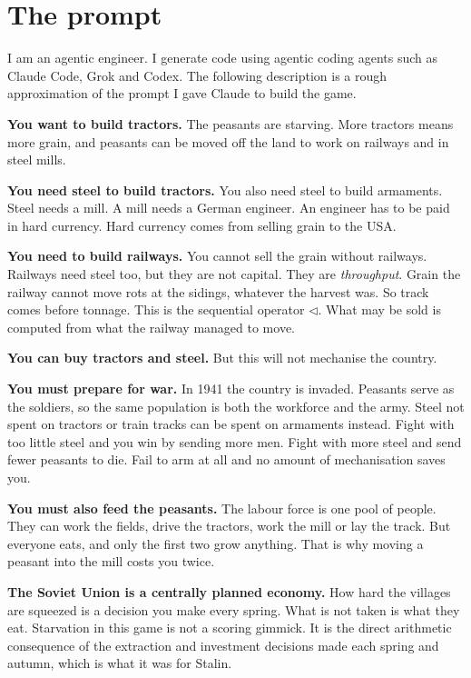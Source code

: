 \documentclass[11pt,a4paper]{article}
\begin{document}
\vspace{6mm}

\section{The prompt}

I am an agentic engineer. I generate code using agentic coding agents such as Claude Code, Grok and
Codex. The following description is a rough approximation of the prompt I gave Claude to build the
game.

\textbf{You want to build tractors.} The peasants are starving. More tractors means more grain, and
peasants can be moved off the land to work on railways and in steel mills.

\textbf{You need steel to build tractors.} You also need steel to build armaments. Steel needs a
mill. A mill needs a German engineer.
An engineer has to be paid in hard currency. Hard currency comes from selling grain to the USA.

\textbf{You need to build railways.} You cannot sell the grain without railways. Railways need steel too, but they are not capital. They are \emph{throughput}. Grain the railway cannot
move rots at the sidings, whatever the harvest was. So track comes before tonnage. This is the
sequential operator $\lhd$. What may be sold is computed from what the railway managed to move.

\textbf{You can buy tractors and steel.} But this will not mechanise the country.

\textbf{You must prepare for war.} In 1941 the country is invaded. Peasants serve as the soldiers, so the same population is both the workforce and
the army. Steel not spent on tractors or train tracks can be spent on armaments instead. Fight with too
little steel and you win by sending more men. Fight with more steel and send fewer peasants to die. Fail to arm at
all and no amount of mechanisation saves you.

\textbf{You must also feed the peasants.} The labour force is one pool of people. They can work the
fields, drive the tractors, work the mill or lay the track. But everyone eats, and only the first
two grow anything. That is why moving a peasant into the mill costs you twice.

\textbf{The Soviet Union is a centrally planned economy.} How hard the villages are squeezed is a decision
you make every spring. What is not taken is what
they eat. Starvation in this game is not a scoring gimmick. It is the direct arithmetic consequence
of the extraction and investment decisions made each spring and autumn, which is what it was for
Stalin.
\end{document}
